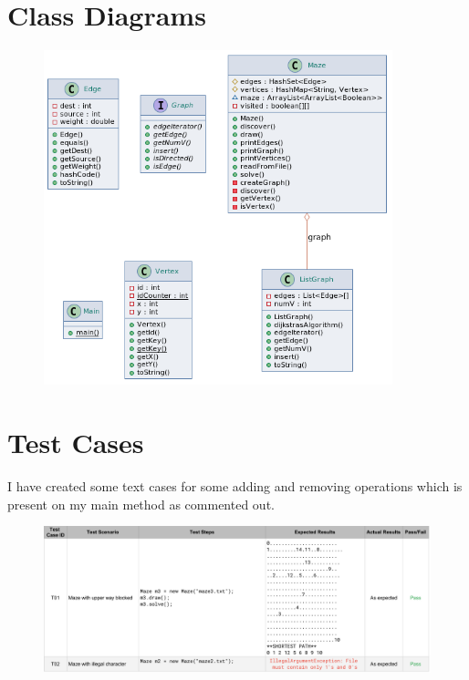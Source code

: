 \documentclass[a4paper]{article}
\begin{document}
\begin{large}
  \newpage

  \section{Class Diagrams}

  \begin{figure}[htp]
    \centering
    \includegraphics[width=0.9\textwidth]{class-diagram-3}
  \end{figure}

  \newpage

  \section{Test Cases}

  I have created some text cases for some adding and removing operations which is present on my main method as commented out.

  \begin{figure}[htp]
    \centering
    \hspace*{-1.5cm}
    \includegraphics[width=1.20\textwidth]{test-case-3}
  \end{figure}


\end{large}
\end{document}
